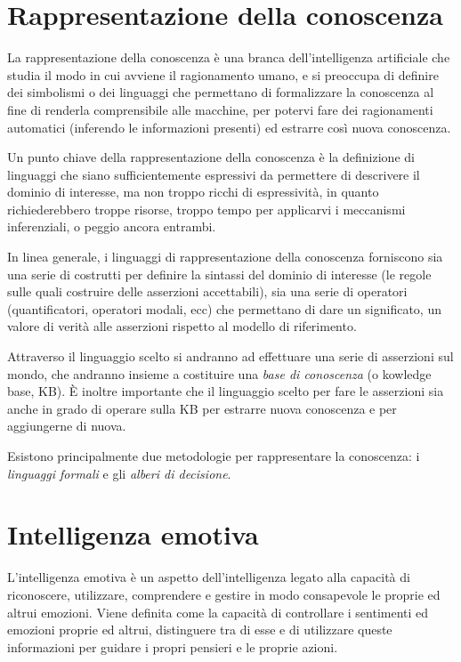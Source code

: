 \section{Rappresentazione della conoscenza}
La rappresentazione della conoscenza è una branca dell'intelligenza artificiale che studia il modo in cui avviene il ragionamento umano, e si preoccupa di definire dei simbolismi o dei linguaggi che permettano di formalizzare la conoscenza al fine di renderla comprensibile alle macchine, per potervi fare dei ragionamenti automatici (inferendo le informazioni presenti) ed estrarre così nuova conoscenza.

Un punto chiave della rappresentazione della conoscenza è la definizione di linguaggi che siano sufficientemente espressivi da permettere di descrivere il dominio di interesse, ma non troppo ricchi di espressività, in quanto richiederebbero troppe risorse, troppo tempo per applicarvi i meccanismi inferenziali, o peggio ancora entrambi.

In linea generale, i linguaggi di rappresentazione della conoscenza forniscono sia una serie di costrutti per definire la sintassi del dominio di interesse (le regole sulle quali costruire delle asserzioni accettabili), sia una serie di operatori (quantificatori, operatori modali, ecc) che permettano di dare un significato, un valore di verità alle asserzioni rispetto al modello di riferimento.

Attraverso il linguaggio scelto si andranno ad effettuare una serie di asserzioni sul mondo, che andranno insieme a costituire una \emph{base di conoscenza} (o kowledge base, KB). È inoltre importante che il linguaggio scelto per fare le asserzioni sia anche in grado di operare sulla KB per estrarre nuova conoscenza e per aggiungerne di nuova.

Esistono principalmente due metodologie per rappresentare la conoscenza: i \emph{linguaggi formali} e gli \emph{alberi di decisione}.

\section{Intelligenza emotiva}
L'intelligenza emotiva è un aspetto dell'intelligenza legato alla capacità di riconoscere, utilizzare, comprendere e gestire in modo consapevole le proprie ed altrui emozioni. Viene definita come la capacità di controllare i sentimenti ed emozioni proprie ed altrui, distinguere tra di esse e di utilizzare queste informazioni per guidare i propri pensieri e le proprie azioni.
